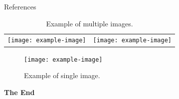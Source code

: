 \documentclass[aspectratio=169,xcolor=dvipsnames]{beamer}
\begin{document}
\begin{frame}{References}

    \begin{table}
        \centering
        \begin{tabular}{cc}
            \texttt{[image: example-image]} &
            \texttt{[image: example-image]} \\
        \end{tabular}
        \caption{Example of multiple images.}
        \label{tab:1}
    \end{table}
\end{frame}


\begin{frame}

    \begin{figure}
        \centering
        \texttt{[image: example-image]}
        \caption{Example of single image.}
        \label{fig:1}
    \end{figure}

    \Huge{\centerline{\textbf{The End}}}
\end{frame}

\end{document}
